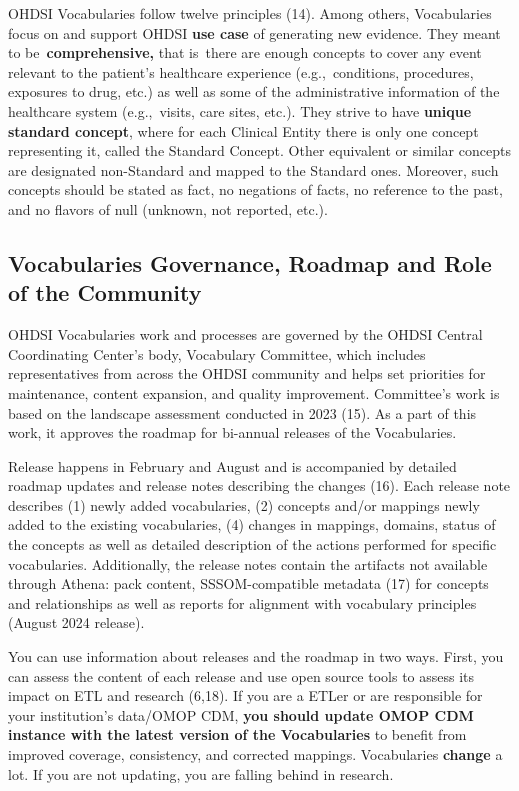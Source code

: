 \documentclass[
  letterpaper,
  paper=7in:10in,
  pagesize=pdftex,
  headinclude=on,
  footinclude=on,
  12pt]{scrbook}
\begin{document}
OHDSI Vocabularies follow twelve principles (14). Among others,
Vocabularies focus on and support OHDSI \textbf{use case} of generating
new evidence. They meant to be~\textbf{comprehensive,} that is~there are
enough concepts to cover any event relevant to the patient's healthcare
experience (e.g.,~conditions, procedures, exposures to drug, etc.) as
well as some of the administrative information of the healthcare system
(e.g.,~visits, care sites, etc.). They strive to have \textbf{unique
standard concept}, where for each Clinical Entity there is only one
concept representing it, called the Standard Concept. Other equivalent
or similar concepts are designated non-Standard and mapped to the
Standard ones. Moreover, such concepts should be stated as fact, no
negations of facts, no reference to the past, and no flavors of null
(unknown, not reported, etc.).

\subsection{Vocabularies Governance, Roadmap and Role of the
Community}\label{vocabularies-governance-roadmap-and-role-of-the-community}

OHDSI Vocabularies work and processes are governed by the OHDSI Central
Coordinating Center's body, Vocabulary Committee, which includes
representatives from across the OHDSI community and helps set priorities
for maintenance, content expansion, and quality improvement. Committee's
work is based on the landscape assessment conducted in 2023 (15). As a
part of this work, it approves the roadmap for bi-annual releases of the
Vocabularies.

Release happens in February and August and is accompanied by detailed
roadmap updates and release notes describing the changes (16). Each
release note describes (1) newly added vocabularies, (2) concepts and/or
mappings newly added to the existing vocabularies, (4) changes in
mappings, domains, status of the concepts as well as detailed
description of the actions performed for specific vocabularies.
Additionally, the release notes contain the artifacts not available
through Athena: pack content, SSSOM-compatible metadata (17) for
concepts and relationships as well as reports for alignment with
vocabulary principles (August 2024 release).

You can use information about releases and the roadmap in two ways.
First, you can assess the content of each release and use open source
tools to assess its impact on ETL and research (6,18). If you are a
ETLer or are responsible for your institution's data/OMOP CDM,
\textbf{you should update OMOP CDM instance with the latest version of
the Vocabularies} to benefit from improved coverage, consistency, and
corrected mappings. Vocabularies \textbf{change} a lot. If you are not
updating, you are falling behind in research.
\end{document}
